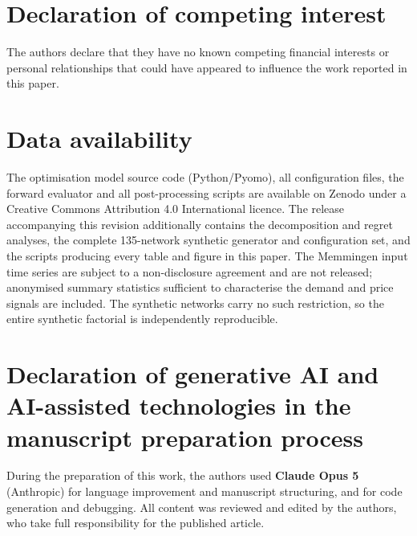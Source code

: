 \section*{Declaration of competing interest}


The authors declare that they have no known competing financial interests or personal
relationships that could have appeared to influence the work reported in this paper.

\section*{Data availability}

The optimisation model source code (Python/Pyomo), all configuration files, the forward
evaluator and all post-processing scripts are available on Zenodo
\citep{ruess_2026_calion} under a Creative Commons Attribution 4.0 International licence.
The release accompanying this revision additionally contains the decomposition and regret
analyses, the complete 135-network synthetic generator and configuration set, and the
scripts producing every table and figure in this paper. The Memmingen input time series
are subject to a non-disclosure agreement and are not released; anonymised summary
statistics sufficient to characterise the demand and price signals are included. The
synthetic networks carry no such restriction, so the entire synthetic factorial is
independently reproducible.

\section*{Declaration of generative AI and AI-assisted technologies in the manuscript
preparation process}


During the preparation of this work, the authors used \textbf{Claude Opus 5} (Anthropic)
for language improvement and manuscript structuring, and for code generation and
debugging. All content was reviewed and edited by the authors, who take full
responsibility for the published article.
